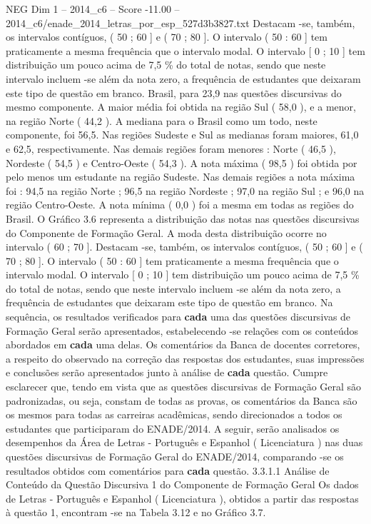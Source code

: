 \begin{textsample}{NEG Dim 1 – 2014\_c6 – Score -11.00 – 2014\_c6/enade\_2014\_letras\_por\_esp\_527d3b3827.txt}
Destacam -se, também, os intervalos contíguos, ( 50 ; 60 ] e ( 70 ; 80 ].
O intervalo ( 50 : 60 ] tem praticamente a mesma frequência que o intervalo modal.
O intervalo [ 0 ; 10 ] tem distribuição um pouco acima de 7,5 \% do total de notas, sendo que neste intervalo incluem -se além da nota zero, a frequência de estudantes que deixaram este tipo de questão em branco.
Brasil, para 23,9 nas questões discursivas do mesmo componente.
A maior média foi obtida na região Sul ( 58,0 ), e a menor, na região Norte ( 44,2 ).
A mediana para o Brasil como um todo, neste componente, foi 56,5.
Nas regiões Sudeste e Sul as medianas foram maiores, 61,0 e 62,5, respectivamente.
Nas demais regiões foram menores : Norte ( 46,5 ), Nordeste ( 54,5 ) e Centro-Oeste ( 54,3 ).
A nota máxima ( 98,5 ) foi obtida por pelo menos um estudante na região Sudeste.
Nas demais regiões a nota máxima foi : 94,5 na região Norte ; 96,5 na região Nordeste ; 97,0 na região Sul ; e 96,0 na região Centro-Oeste.
A nota mínima ( 0,0 ) foi a mesma em todas as regiões do Brasil.
O Gráfico 3.6 representa a distribuição das notas nas questões discursivas do Componente de Formação Geral.
A moda desta distribuição ocorre no intervalo ( 60 ; 70 ].
Destacam -se, também, os intervalos contíguos, ( 50 ; 60 ] e ( 70 ; 80 ].
O intervalo ( 50 : 60 ] tem praticamente a mesma frequência que o intervalo modal.
O intervalo [ 0 ; 10 ] tem distribuição um pouco acima de 7,5 \% do total de notas, sendo que neste intervalo incluem -se além da nota zero, a frequência de estudantes que deixaram este tipo de questão em branco.
Na sequência, os resultados verificados para \textbf{cada} uma das questões discursivas de Formação Geral serão apresentados, estabelecendo -se relações com os conteúdos abordados em \textbf{cada} uma delas.
Os comentários da Banca de docentes corretores, a respeito do observado na correção das respostas dos estudantes, suas impressões e conclusões serão apresentados junto à análise de \textbf{cada} questão.
Cumpre esclarecer que, tendo em vista que as questões discursivas de Formação Geral são padronizadas, ou seja, constam de todas as provas, os comentários da Banca são os mesmos para todas as carreiras acadêmicas, sendo direcionados a todos os estudantes que participaram do ENADE/2014.
A seguir, serão analisados os desempenhos da Área de Letras - Português e Espanhol ( Licenciatura ) nas duas questões discursivas de Formação Geral do ENADE/2014, comparando -se os resultados obtidos com comentários para \textbf{cada} questão. 3.3.1.1 Análise de Conteúdo da Questão Discursiva 1 do Componente de Formação Geral Os dados de Letras - Português e Espanhol ( Licenciatura ), obtidos a partir das respostas à questão 1, encontram -se na Tabela 3.12 e no Gráfico 3.7.

\end{textsample}
